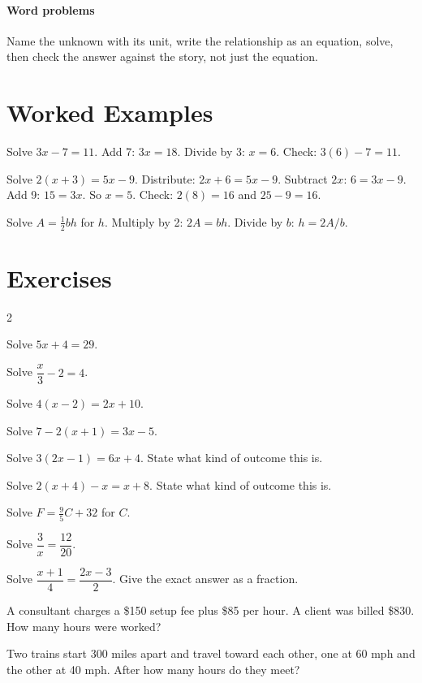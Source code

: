 \paragraph{Word problems} Name the unknown with its unit, write the relationship as an equation, solve, then check the answer against the story, not just the equation.

\section{Worked Examples}

\begin{example}
Solve $3x - 7 = 11$.
\solution Add 7: $3x = 18$. Divide by 3: $x = 6$. Check: $3(6) - 7 = 11$.
\end{example}

\begin{example}
Solve $2(x + 3) = 5x - 9$.
\solution Distribute: $2x + 6 = 5x - 9$. Subtract $2x$: $6 = 3x - 9$. Add 9: $15 = 3x$. So $x = 5$. Check: $2(8) = 16$ and $25 - 9 = 16$.
\end{example}

\begin{example}
Solve $A = \tfrac{1}{2}bh$ for $h$.
\solution Multiply by 2: $2A = bh$. Divide by $b$: $h = 2A/b$.
\end{example}

\section{Exercises}

\begin{multicols}{2}
\begin{exercises}
\item Solve $5x + 4 = 29$.
\item Solve $\dfrac{x}{3} - 2 = 4$.
\item Solve $4(x - 2) = 2x + 10$.
\item Solve $7 - 2(x + 1) = 3x - 5$.
\item Solve $3(2x - 1) = 6x + 4$. State what kind of outcome this is.
\item Solve $2(x + 4) - x = x + 8$. State what kind of outcome this is.
\item Solve $F = \tfrac{9}{5}C + 32$ for $C$.
\item Solve $\dfrac{3}{x} = \dfrac{12}{20}$.
\item Solve $\dfrac{x + 1}{4} = \dfrac{2x - 3}{2}$. Give the exact answer as a fraction.
\item A consultant charges a \$150 setup fee plus \$85 per hour. A client was billed \$830. How many hours were worked?
\item Two trains start 300 miles apart and travel toward each other, one at 60 mph and the other at 40 mph. After how many hours do they meet?
\end{exercises}
\end{multicols}

